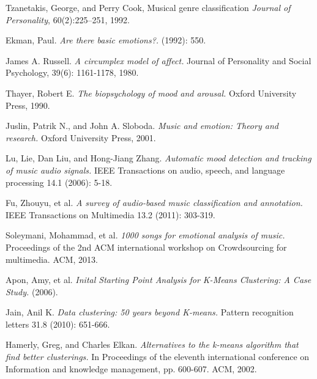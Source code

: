 \begin{thebibliography}{9}
                Tzanetakis, George, and Perry Cook, Musical genre classification 
                \emph{Journal of Personality},
                60(2):225–251,
                1992.

                Ekman, Paul. 
                \emph{Are there basic emotions?.} 
                (1992): 550.

                James A. Russell. 
                \emph{A circumplex model of affect.} 
                Journal of Personality and Social Psychology, 39(6): 1161-1178, 1980.

                Thayer, Robert E. 
                \emph{The biopsychology of mood and arousal.} 
                Oxford University Press, 1990.

                Juslin, Patrik N., and John A. Sloboda. 
                \emph{Music and emotion: Theory and research.} 
                Oxford University Press, 2001.

                Lu, Lie, Dan Liu, and Hong-Jiang Zhang. 
                \emph{Automatic mood detection and tracking of music audio signals.} 
                IEEE Transactions on audio, speech, and language processing 14.1 (2006): 5-18.

                Fu, Zhouyu, et al. 
                \emph{A survey of audio-based music classification and annotation.} 
                IEEE Transactions on Multimedia 13.2 (2011): 303-319.

                Soleymani, Mohammad, et al. 
                \emph{1000 songs for emotional analysis of music.} 
                Proceedings of the 2nd ACM international workshop on Crowdsourcing for multimedia. ACM, 2013.

                Apon, Amy, et al. 
                \emph{Inital Starting Point Analysis for K-Means Clustering: A Case Study.} 
                (2006).

                Jain, Anil K. 
                \emph{Data clustering: 50 years beyond K-means.} 
                Pattern recognition letters 31.8 (2010): 651-666.

                Hamerly, Greg, and Charles Elkan. 
                \emph{Alternatives to the k-means algorithm that find better clusterings.} 
                In Proceedings of the eleventh international conference on Information and knowledge management, pp. 600-607.
                ACM, 2002.

\end{thebibliography}
